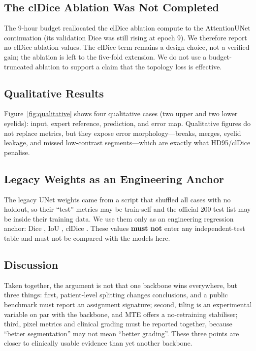 \subsection{The clDice Ablation Was Not Completed}

The 9-hour budget reallocated the clDice ablation compute to the AttentionUNet continuation (its validation Dice was still rising at epoch 9). We therefore report no clDice ablation values. The clDice term remains a design choice, not a verified gain; the ablation is left to the five-fold extension. We do not use a budget-truncated ablation to support a claim that the topology loss is effective.

\subsection{Qualitative Results}\label{sec:qualitative}

Figure~\ref{fig:qualitative} shows four qualitative cases (two upper and two lower eyelids): input, expert reference, prediction, and error map. Qualitative figures do not replace metrics, but they expose error morphology---breaks, merges, eyelid leakage, and missed low-contrast segments---which are exactly what HD95/clDice penalise.



\subsection{Legacy Weights as an Engineering Anchor}

The legacy UNet weights came from a script that shuffled all \nTotal{} cases with no holdout, so their ``test'' metrics may be train-self and the official 200 test list may be inside their training data. We use them only as an engineering regression anchor: Dice \legacyUNetSelfDice, IoU \legacyUNetSelfIoU, clDice \legacyUNetSelfClDice. These values \textbf{must not} enter any independent-test table and must not be compared with the models here.

\subsection{Discussion}

Taken together, the argument is not that one backbone wins everywhere, but three things: first, patient-level splitting changes conclusions, and a public benchmark must report an assignment signature; second, tiling is an experimental variable on par with the backbone, and MTE offers a no-retraining stabiliser; third, pixel metrics and clinical grading must be reported together, because ``better segmentation'' may not mean ``better grading''. These three points are closer to clinically usable evidence than yet another backbone.
